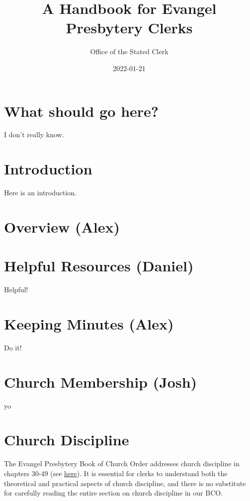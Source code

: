 \documentclass[
]{book}
\title{A Handbook for Evangel Presbytery Clerks}
\author{Office of the Stated Clerk}
\date{2022-01-21}
\begin{document}
\maketitle

{
\setcounter{tocdepth}{1}
\tableofcontents
}
\hypertarget{what-should-go-here}{%
\chapter{What should go here?}\label{what-should-go-here}}

I don't really know.

\hypertarget{intro}{%
\chapter{Introduction}\label{intro}}

Here is an introduction.

\hypertarget{overview-alex}{%
\chapter{Overview (Alex)}\label{overview-alex}}

\hypertarget{helpful-resources-daniel}{%
\chapter{Helpful Resources (Daniel)}\label{helpful-resources-daniel}}

Helpful!

\hypertarget{keeping-minutes-alex}{%
\chapter{Keeping Minutes (Alex)}\label{keeping-minutes-alex}}

Do it!

\hypertarget{church-membership-josh}{%
\chapter{Church Membership (Josh)}\label{church-membership-josh}}

yo

\hypertarget{church-discipline}{%
\chapter{Church Discipline}\label{church-discipline}}

The Evangel Presbytery Book of Church Order addresses church discipline in chapters 30-49 (see \href{https://evangel.pressbooks.com/chapter/30-discipline-its-nature-subjects-and-ends/}{here}). It is essential for clerks to understand both the theoretical and practical aspects of church discipline, and there is no substitute for carefully reading the entire section on church discipline in our BCO.
\end{document}
